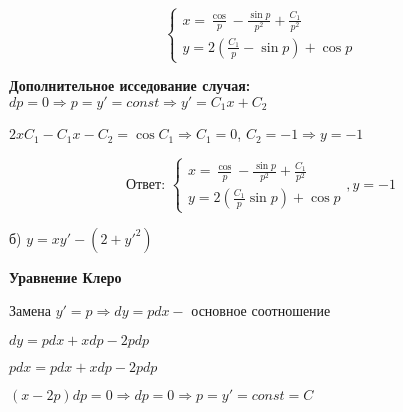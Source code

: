 \documentclass[a4paper]{article}
\begin{document}
\vspace{0.3cm}

\begin{equation*}
\displaystyle \begin{cases}
\displaystyle x=\frac{\cos}{p}-\frac{\sin{p}}{p^2}+\frac{C_1}{p^2}\\
\displaystyle y=2(\frac{C_1}{p}-\sin{p}) + \cos{p}
  \end{cases}
  \end{equation*}

\vspace{0.3cm}

\textbf{Дополнительное исседование случая:} $\displaystyle dp=0 \Rightarrow p=y' =const \Rightarrow y'=C_1x+C_2$

\vspace{0.3cm}

$\displaystyle 2xC_1-C_1x-C_2=\cos{C_1} \Rightarrow C_1=0$, $ C_2=-1 \Rightarrow y=-1$

\vspace{0.3cm}

\begin{equation*}
\textbf{Ответ: }
\displaystyle \begin{cases}
\displaystyle x=\frac{\cos}{p}-\frac{\sin{p}}{p^2}+\frac{C_1}{p^2}\\
\displaystyle y=2(\frac{C_1}{p}\sin{p}) + \cos{p}
  \end{cases}
  , \displaystyle y=-1
  \end{equation*}


\vspace{1cm}

б) $\displaystyle y=xy'-(2+y'^{2})$

\vspace{0.3cm}

\textbf{Уравнение Клеро}

\vspace{0.3cm}

Замена $\displaystyle y'=p \Rightarrow dy=pdx - $ основное соотношение

\vspace{0.3cm}


$\displaystyle dy=pdx+xdp-2pdp$

\vspace{0.3cm}

$\displaystyle pdx=pdx+xdp-2pdp$

\vspace{0.3cm}

$\displaystyle (x-2p)dp=0 \Rightarrow dp=0 \Rightarrow p =y'=const=C$
\end{document}
